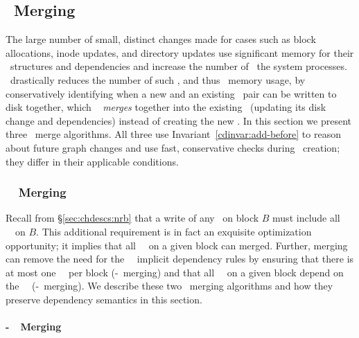 \subsection{\ChDesc\ Merging}
\label{sec:patch:merge}

The large number of small, distinct changes made for cases such as
block allocations, inode updates, and directory updates use
significant memory for their \chdesc\ structures and dependencies and
increase the number of \chdescs\ the system processes.
%
\Kudos\ drastically reduces the number of such \chdescs, and thus
\chdesc\ memory usage, by conservatively identifying when a new and an
existing \chdesc\ pair can be written to disk together, which \Kudos\
%
\emph{merges} together into the existing \chdesc\ (updating its disk
change and dependencies) instead of creating the new \chdesc.
%
In this section we present three \chdesc\ merge algorithms. All three
use Invariant~\ref{cdinvar:add-before} to reason about future graph
changes and use fast, conservative checks during \chdesc\ creation; they
differ in their applicable conditions.

\subsubsection{\Nrb\ \ChDesc\ Merging}
\label{sec:chdescs:merge:nrb}

Recall from \S\ref{sec:chdescs:nrb} that a write of any \chdescs\ on block
$B$ must include all \nrb\ \chdescs\ on $B$.
%
This additional requirement is in fact an exquisite optimization
opportunity; it implies that all \nrb\ \chdescs\ on a given block can
merged.
%
Further, merging can remove the need for the \nrb\ \chdesc\ implicit
dependency rules by ensuring that
%
there is at most one \nrb\ \chdesc\ per block (\nrb-\nrb\ merging)
%
and that all \rb\ \chdescs\ on a given block depend on the \nrb\ \chdesc\
(\nrb-\rb\ merging).
%
We describe these two \chdesc\ merging algorithms and how they
preserve dependency semantics in this section.

\paragraph{\Nrb-\Nrb\ \ChDesc\ Merging}
\label{sec:chdescs:merge:nrb:hard-hard}

